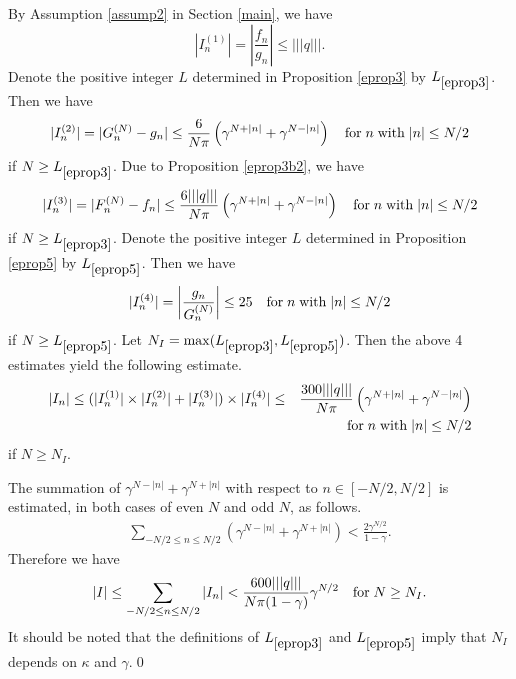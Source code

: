 By Assumption \ref{assump2} in Section \ref{main}, we have
\begin{displaymath}
|{I}^{(1)}_n|=\left|\frac{f_n}{g_n}\right|\le|||q|||.
\end{displaymath}
Denote the positive integer $L$ determined in Proposition \ref{eprop3} by $L_{\ref{eprop3}}$. Then we have
\begin{eqnarray*}
|I^{(2)}_n| = |G^{(N)}_n-g_n| \le \frac{6}{N\pi}\left(\gamma^{N+|n|}+\gamma^{N-|n|}\right) \quad
 {\rm for}\;n\;{\rm with}\; |n| \le N/2
\end{eqnarray*}
if $N \ge L_{\ref{eprop3}}$.
Due to Proposition \ref{eprop3b2}, we have
\begin{eqnarray*}
|I^{(3)}_n| = |F^{(N)}_n-f_n| \le \frac{6|||q|||}{N\pi}\left(\gamma^{N+|n|}+\gamma^{N-|n|}\right) 
 \quad
 {\rm for}\;n\;{\rm with}\; |n| \le N/2
\end{eqnarray*}
if $N \ge L_{\ref{eprop3}}$.
Denote the positive integer $L$ determined in Proposition \ref{eprop5} by $L_{\ref{eprop5}}$. Then we have
\begin{displaymath}
|I^{(4)}_n| = \left|\frac{g_n}{G^{(N)}_n}\right|\le 25  \quad {\rm for}\;n\;{\rm with}\; |n| \le N/2
\end{displaymath}
if $N \ge L_{\ref{eprop5}}$.
Let $N_I=\max(L_{\ref{eprop3}}, L_{\ref{eprop5}})$. Then the above 4 estimates yield the following estimate.
\begin{eqnarray*}
|I_n| \le (|I^{(1)}_n|\times |I^{(2)}_n| + |I^{(3)}_n|) \times |I^{(4)}_n| &\le& \displaystyle\frac{300|||q|||}{N\pi}\left(\gamma^{N+|n|}+\gamma^{N-|n|}\right) \\
&& {\rm for}\;n\;{\rm with}\; |n| \le N/2
\end{eqnarray*}
if $N \ge N_I$.

The summation of $\gamma^{N-|n|}+\gamma^{N+|n|}$ with respect to $n\in[-N/2,N/2]$ is estimated, in both cases of even $N$ and odd $N$, as follows.
\begin{eqnarray*}
\sum_{-N/2 \le n \le N/2}(\gamma^{N-|n|}+\gamma^{N+|n|}) < \frac{2\gamma^{N/2}}{1-\gamma}.
\end{eqnarray*}
Therefore we have
\begin{displaymath}
|I| \le \sum_{-N/2 \le n \le N/2}|I_n| < \frac{600|||q|||}{N\pi(1-\gamma)}\gamma^{N/2} \quad {\rm for}\;N \ge N_I.
\end{displaymath}
It should be noted that the definitions of $L_{\ref{eprop3}}$ and $L_{\ref{eprop5}}$ imply that $N_I$ depends on $\kappa$ and $\gamma$.\qed



